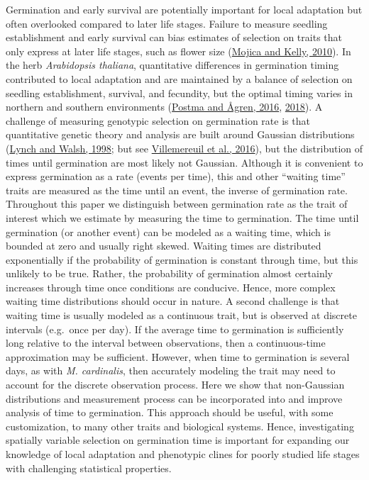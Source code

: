 \documentclass[
  12pt,
]{article}
\begin{document}
Germination and early survival are potentially important for local adaptation but often overlooked compared to later life stages. Failure to measure seedling establishment and early survival can bias estimates of selection on traits that only express at later life stages, such as flower size (\protect\hyperlink{ref-mojica_viability_2010}{Mojica and Kelly, 2010}). In the herb \emph{Arabidopsis thaliana}, quantitative differences in germination timing contributed to local adaptation and are maintained by a balance of selection on seedling establishment, survival, and fecundity, but the optimal timing varies in northern and southern environments (\protect\hyperlink{ref-postma_early_2016}{Postma and Ågren, 2016}, \protect\hyperlink{ref-postma_among-year_2018}{2018}). A challenge of measuring genotypic selection on germination rate is that quantitative genetic theory and analysis are built around Gaussian distributions (\protect\hyperlink{ref-lynch_genetics_1998}{Lynch and Walsh, 1998}; but see \protect\hyperlink{ref-de_villemereuil_general_2016}{Villemereuil et al., 2016}), but the distribution of times until germination are most likely not Gaussian. Although it is convenient to express germination as a rate (events per time), this and other ``waiting time'' traits are measured as the time until an event, the inverse of germination rate. Throughout this paper we distinguish between germination rate as the trait of interest which we estimate by measuring the time to germination. The time until germination (or another event) can be modeled as a waiting time, which is bounded at zero and usually right skewed. Waiting times are distributed exponentially if the probability of germination is constant through time, but this unlikely to be true. Rather, the probability of germination almost certainly increases through time once conditions are conducive. Hence, more complex waiting time distributions should occur in nature. A second challenge is that waiting time is usually modeled as a continuous trait, but is observed at discrete intervals (e.g.~once per day). If the average time to germination is sufficiently long relative to the interval between observations, then a continuous-time approximation may be sufficient. However, when time to germination is several days, as with \emph{M. cardinalis}, then accurately modeling the trait may need to account for the discrete observation process. Here we show that non-Gaussian distributions and measurement process can be incorporated into and improve analysis of time to germination. This approach should be useful, with some customization, to many other traits and biological systems. Hence, investigating spatially variable selection on germination time is important for expanding our knowledge of local adaptation and phenotypic clines for poorly studied life stages with challenging statistical properties.
\end{document}
